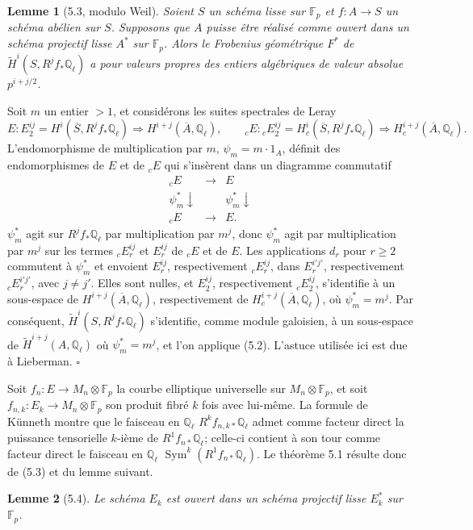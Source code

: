 \documentclass[10pt]{article}
\newcommand{\Q}{\mathbb Q}
\newcommand{\Sym}{\operatorname{Sym}}
\newcommand{\QED}{\hfill$\square$}
\newcommand{\F}{\mathbb F}
\newtheorem*{lemma}{Lemme}
\begin{document}
\begin{lemma}[5.3, modulo Weil]
Soient $S$ un schéma lisse sur $\F_p$ et $f:A\to S$ un schéma abélien sur $S$. Supposons que $A$ puisse être réalisé comme ouvert dans un schéma projectif lisse $A^*$ sur $\F_p$. Alors le Frobenius géométrique $F^*$ de $\widetilde H^i(S,R^jf_*\Q_\ell)$ a pour valeurs propres des entiers algébriques de valeur absolue $p^{i+j/2}$.
\end{lemma}

Soit $m$ un entier $>1$, et considérons les suites spectrales de Leray
\[
E:
E_2^{ij}=H^i(\overline S,R^jf_*\Q_\ell)\Longrightarrow H^{i+j}(\overline A,\Q_\ell),
\qquad
{}_cE:
{}_cE_2^{ij}=H_c^i(\overline S,R^jf_*\Q_\ell)\Longrightarrow H_c^{i+j}(\overline A,\Q_\ell).
\]
L'endomorphisme de multiplication par $m$, $\psi_m=m\cdot1_A$, définit des endomorphismes de $E$ et de ${}_cE$ qui s'insèrent dans un diagramme commutatif
\[
\begin{array}{ccc}
{}_cE&\longrightarrow&E\\
\psi_m^*\downarrow&&\psi_m^*\downarrow\\
{}_cE&\longrightarrow&E.
\end{array}
\]
$\psi_m^*$ agit sur $R^jf_*\Q_\ell$ par multiplication par $m^j$, donc $\psi_m^*$ agit par multiplication par $m^j$ sur les termes ${}_cE_r^{ij}$ et $E_r^{ij}$ de ${}_cE$ et de $E$. Les applications $d_r$ pour $r\ge2$ commutent à $\psi_m^*$ et envoient $E_r^{ij}$, respectivement ${}_cE_r^{ij}$, dans $E_r^{i'j'}$, respectivement ${}_cE_r^{i'j'}$, avec $j\ne j'$. Elles sont nulles, et $E_2^{ij}$, respectivement ${}_cE_2^{ij}$, s'identifie à un sous-espace de $H^{i+j}(\overline A,\Q_\ell)$, respectivement de $H_c^{i+j}(\overline A,\Q_\ell)$, où $\psi_m^*=m^j$. Par conséquent, $\widetilde H^i(S,R^jf_*\Q_\ell)$ s'identifie, comme module galoisien, à un sous-espace de $\widetilde H^{i+j}(A,\Q_\ell)$ où $\psi_m^*=m^j$, et l'on applique (5.2). L'astuce utilisée ici est due à Lieberman. \QED

Soit $f_n:E\to M_n\otimes\F_p$ la courbe elliptique universelle sur $M_n\otimes\F_p$, et soit $f_{n,k}:E_k\to M_n\otimes\F_p$ son produit fibré $k$ fois avec lui-même. La formule de Künneth montre que le faisceau en $\Q_\ell$ $R^kf_{n,k*}\Q_\ell$ admet comme facteur direct la puissance tensorielle $k$-ième de $R^1f_{n*}\Q_\ell$; celle-ci contient à son tour comme facteur direct le faisceau en $\Q_\ell$ $\Sym^k(R^1f_{n*}\Q_\ell)$. Le théorème 5.1 résulte donc de (5.3) et du lemme suivant.

\begin{lemma}[5.4]
Le schéma $E_k$ est ouvert dans un schéma projectif lisse $E_k^*$ sur $\F_p$.
\end{lemma}
\end{document}
